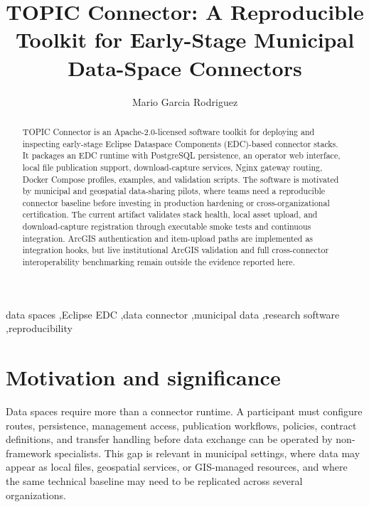 \documentclass[preprint,12pt]{elsarticle}
\begin{document}
\begin{frontmatter}

\title{TOPIC Connector: A Reproducible Toolkit for Early-Stage Municipal Data-Space Connectors}

\author[uc3m]{Mario Garcia Rodriguez}

\begin{abstract}
TOPIC Connector is an Apache-2.0-licensed software toolkit for deploying and inspecting early-stage Eclipse Dataspace Components (EDC)-based connector stacks. It packages an EDC runtime with PostgreSQL persistence, an operator web interface, local file publication support, download-capture services, Nginx gateway routing, Docker Compose profiles, examples, and validation scripts. The software is motivated by municipal and geospatial data-sharing pilots, where teams need a reproducible connector baseline before investing in production hardening or cross-organizational certification. The current artifact validates stack health, local asset upload, and download-capture registration through executable smoke tests and continuous integration. ArcGIS authentication and item-upload paths are implemented as integration hooks, but live institutional ArcGIS validation and full cross-connector interoperability benchmarking remain outside the evidence reported here.
\end{abstract}

\begin{keyword}
data spaces \sep Eclipse EDC \sep data connector \sep municipal data \sep research software \sep reproducibility
\end{keyword}

\end{frontmatter}

\section{Motivation and significance}
Data spaces require more than a connector runtime. A participant must configure routes, persistence, management access, publication workflows, policies, contract definitions, and transfer handling before data exchange can be operated by non-framework specialists. This gap is relevant in municipal settings, where data may appear as local files, geospatial services, or GIS-managed resources, and where the same technical baseline may need to be replicated across several organizations.
\end{document}
